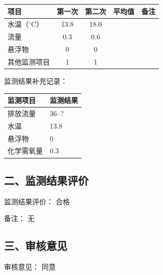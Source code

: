 \documentclass[UTF8,10pt,a4paper,fontset=fandol]{ctexart}
\newcommand{\fieldvalue}[1]{#1}
\newcommand{\handwritten}[1]{#1}
\begin{document}
\begin{tabularx}{\textwidth}{|X|c|c|c|c|}
\hline
项目 & 第一次 & 第二次 & 平均值 & 备注 \\
\hline
水温（$^\circ$C） & 13.8 & 18.0 & & \\
\hline
流量 & 0.3 & 0.6 & & \\
\hline
悬浮物 & 0 & 0 & & \\
\hline
其他监测项目 & 1 & 1 & & \\
\hline
\end{tabularx}

\noindent
监测结果补充记录：

\begin{tabularx}{\textwidth}{|p{}|X|}
\hline
监测项目 &
监测结果 \\
\hline
排放流量 &
\fieldvalue{\handwritten{36--?}} \\
\hline
水温 &
\fieldvalue{\handwritten{13.8}} \\
\hline
悬浮物 &
\fieldvalue{\handwritten{0}} \\
\hline
化学需氧量 &
\fieldvalue{\handwritten{0.3}} \\
\hline
\end{tabularx}

\subsection*{二、监测结果评价}

\noindent
监测结果评价：%
\fieldvalue{\handwritten{合格}}

\noindent
备注：%
\fieldvalue{\handwritten{无}}

\subsection*{三、审核意见}

\noindent
审核意见：%
\fieldvalue{\handwritten{同意}}
\end{document}
